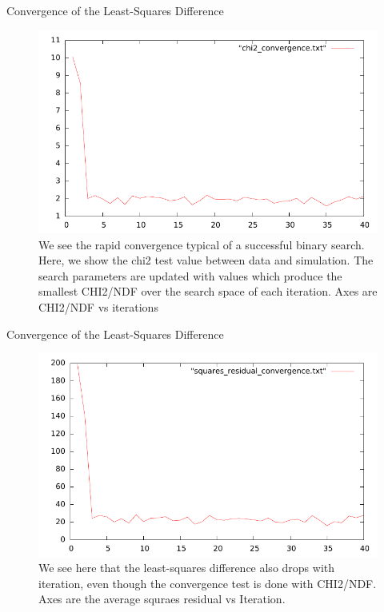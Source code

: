 \begin{frame}{Convergence of the Least-Squares Difference }
\begin{figure}
\begin{center}
\includegraphics[width=0.8\linewidth]{../RootFinding/figs/chi2.pdf}
\end{center}
\caption{We see the rapid convergence typical of a successful binary search.
	Here, we show the chi2 test value between data and simulation. The search
	parameters are updated with values which produce the smallest CHI2/NDF over
	the search space of each iteration.  Axes are CHI2/NDF vs iterations}
\label{fig:convergence_359711_iterations}
\end{figure}
\end{frame}

\begin{frame}{Convergence of the Least-Squares Difference }
\begin{figure}
\begin{center}
\includegraphics[width=0.8\linewidth]{../RootFinding/figs/residual.pdf}
\end{center}
\caption{We see here that the least-squares difference also drops with
	iteration, even though the convergence test is done with CHI2/NDF. Axes are
the average squraes residual vs Iteration.}
\label{fig:convergence_359711_iterations}
\end{figure}
\end{frame}

